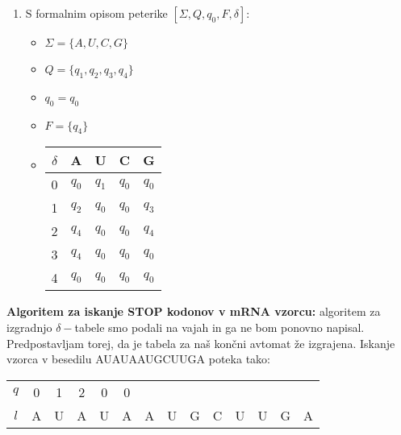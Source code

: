 \documentclass{article}
\begin{document}
\begin{enumerate}
\begin{enumerate}
			\item S formalnim opisom peterike $\left[ \Sigma, Q, q_0, F, \delta \right]$:

				\begin{itemize}
					\item $\Sigma = \{ A, U, C, G \}$
					\item $Q = \{ q_1, q_2, q_3, q_4 \}$
					\item $q_0 = q_0$
					\item $F = \{ q_4 \}$
					\item \begin{tabular}{|c||c|c|c|c|}
							\hline
							$\delta$ & A & U & C & G \\
							\hline \hline
							0 & $q_0$ & $q_1$ & $q_0$ & $q_0$\\
							\hline
							1 & $q_2$ & $q_0$ & $q_0$ & $q_3$\\
							\hline
							2 & $q_4$ & $q_0$ & $q_0$ & $q_4$\\
							\hline
							3 & $q_4$ & $q_0$ & $q_0$ & $q_0$\\
							\hline
							4 & $q_0$ & $q_0$ & $q_0$ & $q_0$ \\
							\hline
						\end{tabular}
				\end{itemize}
		\end{enumerate}

		\newpage

		\textbf{Algoritem za iskanje STOP kodonov v mRNA vzorcu:} algoritem za izgradnjo
		$\delta-$tabele smo podali na vajah in ga ne bom ponovno napisal.
		Predpostavljam torej, da je tabela za naš končni avtomat že izgrajena.
		Iskanje vzorca v besedilu AUAUAAUGCUUGA poteka tako:

		\begin{tabular}{c|c c c c c c c c c c c c c}
			$q$ & 0 & 1 & 2 & 0 & 0 &  & & & & & & & \\
			$l$ & A & U & A & U & A & A & U & G & C & U & U & G & A \\
		\end{tabular}
\end{enumerate}
\end{document}
